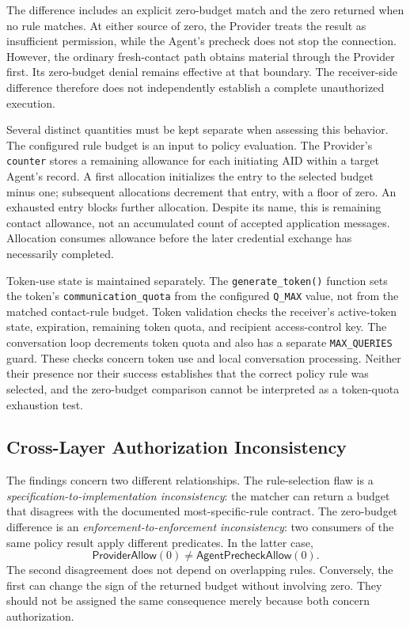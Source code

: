 The difference includes an explicit zero-budget match and the zero returned
when no rule matches. At either source of zero, the Provider treats the
result as insufficient permission, while the Agent's precheck does not stop
the connection. However, the ordinary fresh-contact path obtains material
through the Provider first. Its zero-budget denial remains effective at that
boundary. The receiver-side difference therefore does not independently
establish a complete unauthorized execution.

Several distinct quantities must be kept separate when assessing this
behavior. The configured rule budget is an input to policy evaluation. The
Provider's \texttt{counter} stores a remaining allowance for each initiating
AID within a target Agent's record. A first allocation initializes the entry
to the selected budget minus one; subsequent allocations decrement that
entry, with a floor of zero. An exhausted entry blocks further allocation.
Despite its name, this is remaining contact allowance, not an accumulated
count of accepted application messages. Allocation consumes allowance before
the later credential exchange has necessarily completed.

Token-use state is maintained separately. The \texttt{generate\_token()}
function sets the token's \texttt{communication\_quota} from the configured
\texttt{Q\_MAX} value, not from the matched contact-rule budget. Token validation checks the
receiver's active-token state, expiration, remaining token quota, and
recipient access-control key. The conversation loop decrements token quota
and also has a separate \texttt{MAX\_QUERIES} guard. These checks concern token
use and local conversation processing. Neither their presence nor their
success establishes that the correct policy rule was selected, and the
zero-budget comparison cannot be interpreted as a token-quota exhaustion
test.


\subsection{Cross-Layer Authorization Inconsistency}

The findings concern two different relationships. The rule-selection flaw is
a \emph{specification-to-implementation inconsistency}: the matcher can return
a budget that disagrees with the documented most-specific-rule contract.
The zero-budget difference is an \emph{enforcement-to-enforcement
inconsistency}: two consumers of the same policy result apply different
predicates. In the latter case,
\[
  \mathsf{ProviderAllow}(0)
  \neq \mathsf{AgentPrecheckAllow}(0).
\]
The second disagreement does not depend on overlapping rules. Conversely,
the first can change the sign of the returned budget without involving zero.
They should not be assigned the same consequence merely because both concern
authorization.

